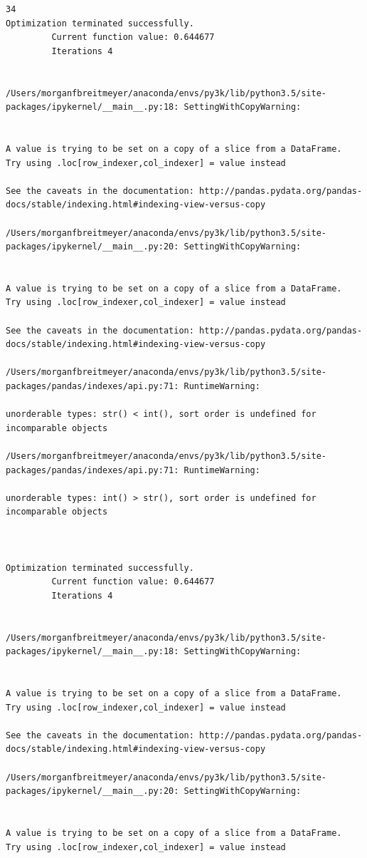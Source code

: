 \begin{lstlisting}
34
Optimization terminated successfully.
         Current function value: 0.644677
         Iterations 4


/Users/morganfbreitmeyer/anaconda/envs/py3k/lib/python3.5/site-packages/ipykernel/__main__.py:18: SettingWithCopyWarning:


A value is trying to be set on a copy of a slice from a DataFrame.
Try using .loc[row_indexer,col_indexer] = value instead

See the caveats in the documentation: http://pandas.pydata.org/pandas-docs/stable/indexing.html#indexing-view-versus-copy

/Users/morganfbreitmeyer/anaconda/envs/py3k/lib/python3.5/site-packages/ipykernel/__main__.py:20: SettingWithCopyWarning:


A value is trying to be set on a copy of a slice from a DataFrame.
Try using .loc[row_indexer,col_indexer] = value instead

See the caveats in the documentation: http://pandas.pydata.org/pandas-docs/stable/indexing.html#indexing-view-versus-copy

/Users/morganfbreitmeyer/anaconda/envs/py3k/lib/python3.5/site-packages/pandas/indexes/api.py:71: RuntimeWarning:

unorderable types: str() < int(), sort order is undefined for incomparable objects

/Users/morganfbreitmeyer/anaconda/envs/py3k/lib/python3.5/site-packages/pandas/indexes/api.py:71: RuntimeWarning:

unorderable types: int() > str(), sort order is undefined for incomparable objects



Optimization terminated successfully.
         Current function value: 0.644677
         Iterations 4


/Users/morganfbreitmeyer/anaconda/envs/py3k/lib/python3.5/site-packages/ipykernel/__main__.py:18: SettingWithCopyWarning:


A value is trying to be set on a copy of a slice from a DataFrame.
Try using .loc[row_indexer,col_indexer] = value instead

See the caveats in the documentation: http://pandas.pydata.org/pandas-docs/stable/indexing.html#indexing-view-versus-copy

/Users/morganfbreitmeyer/anaconda/envs/py3k/lib/python3.5/site-packages/ipykernel/__main__.py:20: SettingWithCopyWarning:


A value is trying to be set on a copy of a slice from a DataFrame.
Try using .loc[row_indexer,col_indexer] = value instead


\end{lstlisting}
